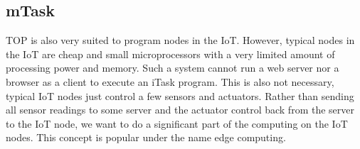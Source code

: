 \documentclass[runningheads]{llncs}
\newcommand{\CleanInline}[1]{\lstinline[language=Clean]!#1!}
\newcommand{\prog}[1]{\CleanInline{#1}}
\begin{document}




\subsection{mTask}%
\label{sec:mtask}

TOP is also very suited to program nodes in the IoT.
However, typical nodes in the IoT are cheap and small microprocessors with a very limited amount of processing power and memory.
Such a system cannot run a web server nor a browser as a client to execute an iTask program.
This is also not necessary, typical IoT nodes just control a few sensors and actuators.
Rather than sending all sensor readings to some server and the actuator control back from the server to the IoT node, we want to do a significant part of the computing on the IoT nodes.
This concept is popular under the name edge computing.
\end{document}
